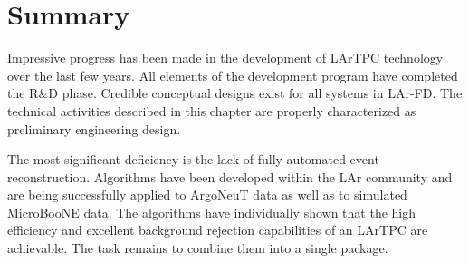 \section{Summary}

Impressive progress has been made in the development of LArTPC technology over the last few years. All elements of the development program have completed the R\&D phase. Credible conceptual designs exist for all systems in LAr-FD. The technical activities described in this chapter are properly characterized as preliminary engineering design.

The most significant deficiency is the lack of fully-automated event reconstruction. Algorithms have been developed within the LAr community and are being successfully applied to ArgoNeuT data as well as to simulated MicroBooNE data. The algorithms have individually shown that the high efficiency and excellent background rejection capabilities of an LArTPC are achievable. The task remains to combine them into a single package. 


